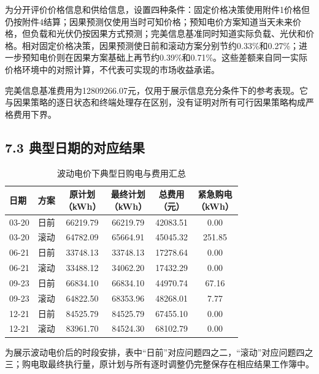 \documentclass[UTF8,a4paper,zihao=-4,fontset=windows]{ctexart}
\begin{document}
为分开评价价格信息和供给信息，设置四种条件：固定价格决策使用附件1价格但仍按附件4结算；因果预测仅使用当时可知价格；预知电价方案知道当天未来价格，但负载和光伏仍按因果方式预测；完美信息基准同时知道实际负载、光伏和价格。相对固定价格决策，因果预测使日前和滚动方案分别节约0.33\%和0.27\%；进一步预知电价则在因果方案基础上再节约0.39\%和0.71\%。这些差额来自同一实际价格环境中的对照计算，不代表可实现的市场收益承诺。
\par
完美信息基准费用为12809266.07元，仅用于展示信息充分条件下的参考表现。它与因果策略的逐日状态和终端处理存在区别，没有证明对所有可行因果策略构成严格费用下界。
\par
\subsection{7.3 典型日期的对应结果}
\begin{table}[H]\centering
\fontsize{9.5}{12}\selectfont\setlength{\tabcolsep}{4pt}\renewcommand{\arraystretch}{1.12}
\begin{adjustbox}{max width=\linewidth}\begin{tabular}{lccccc}\toprule
\textbf{日期} & \textbf{方案} & \shortstack{\textbf{原计划}\\{\normalfont （kWh）}} & \shortstack{\textbf{最终计划}\\{\normalfont （kWh）}} & \shortstack{\textbf{总费用}\\{\normalfont （元）}} & \shortstack{\textbf{紧急购电}\\{\normalfont （kWh）}}\\\midrule
03-20 & 日前 & 66219.79 & 66219.79 & 42083.51 & 0.00\\
03-20 & 滚动 & 64782.09 & 65664.91 & 45045.32 & 251.85\\
06-21 & 日前 & 33748.13 & 33748.13 & 17278.64 & 0.00\\
06-21 & 滚动 & 33488.12 & 34062.20 & 17432.29 & 0.00\\
09-23 & 日前 & 66834.10 & 66834.10 & 44970.74 & 67.16\\
09-23 & 滚动 & 64822.50 & 68353.96 & 48268.01 & 7.77\\
12-21 & 日前 & 84525.79 & 84525.79 & 67455.10 & 0.00\\
12-21 & 滚动 & 83961.70 & 84524.30 & 68102.79 & 0.00\\
\bottomrule\end{tabular}\end{adjustbox}
\caption{波动电价下典型日购电与费用汇总}
\end{table}
为展示波动电价后的时段安排，表中“日前”对应问题四之二，“滚动”对应问题四之三；购电取最终执行量，原计划与所有逐时调整仍完整保存在相应结果工作簿中。
\end{document}
